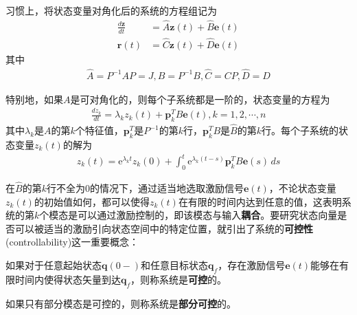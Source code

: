 \documentclass{ctexbook}
\begin{document}
习惯上，将状态变量对角化后的系统的方程组记为\begin{align*}
    \frac{d\mathbf{z}}{dt}&=\hat{A}\mathbf{z}(t)+\hat{B}\mathbf{e}(t)\\
    \mathbf{r}(t)&=\hat{C}\mathbf{z}(t)+\hat{D}\mathbf{e}(t)
\end{align*}
其中\begin{align*}
    \hat{A}=P^{-1}AP=J,\hat{B}=P^{-1}B,\hat{C}=CP,\hat{D}=D
\end{align*}

特别地，如果$A$是可对角化的，则每个子系统都是一阶的，状态变量的方程为\begin{align*}
    \frac{dz_k}{dt}=\lambda_k z_k(t)+\mathbf{p}_k^T B\mathbf{e}(t),k=1,2,\cdots,n
\end{align*}
其中$\lambda_k$是$A$的第$k$个特征值，$\mathbf{p}_k^T$是$P^{-1}$的第$k$行，$\mathbf{p}_k^T B$是$\hat{B}$的第$k$行。每个子系统的状态变量$z_k(t)$的解为\begin{align*}
    z_k(t)=\mathrm{e}^{\lambda_k t}z_k(0)+\int_0^t \mathrm{e}^{\lambda_k (t-s)}\mathbf{p}_k^TB\mathbf{e}(s)\,ds
\end{align*}

在$\hat{B}$的第$k$行不全为0的情况下，通过适当地选取激励信号$\mathbf{e}(t)$，不论状态变量$z_k(t)$的初始值如何，都可以使得$z_k(t)$在有限的时间内达到任意的值，这表明系统的第$k$个模态是可以通过激励控制的，即该模态与输入\textbf{耦合}。要研究状态向量是否可以被适当的激励引向状态空间中的特定位置，就引出了系统的\textbf{可控性}(controllability)这一重要概念：

\begin{definition}[可控性]
    如果对于任意起始状态$\mathbf{q}(0-)$和任意目标状态$\mathbf{q}_f$，存在激励信号$\mathbf{e}(t)$能够在有限时间内使得状态矢量到达$\mathbf{q}_f$，则称系统是\textbf{可控}的。

    如果只有部分模态是可控的，则称系统是\textbf{部分可控}的。
\end{definition}
\end{document}

